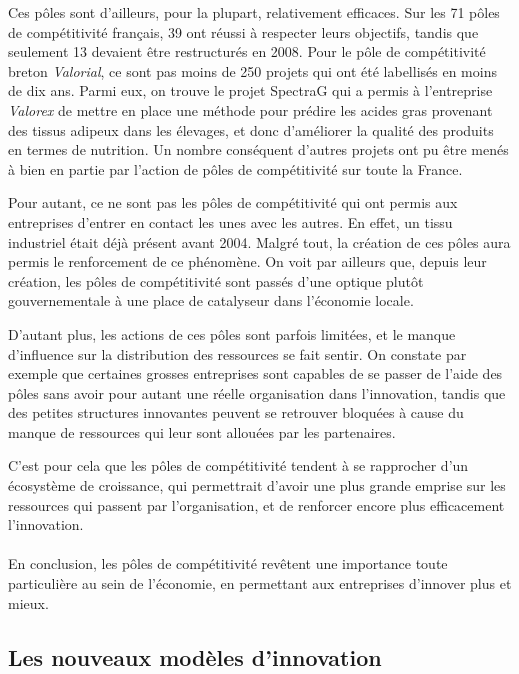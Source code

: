 \documentclass[a4paper,12pt]{report}
\begin{document}
		Ces pôles sont d’ailleurs, pour la plupart, relativement efficaces. Sur les 71 pôles de compétitivité français, 39 ont réussi à respecter leurs objectifs, tandis que seulement 13 devaient être restructurés en 2008\cite{PolesCompetitiviteClusters}. Pour le pôle de compétitivité breton \textit{Valorial}, ce sont pas moins de 250 projets qui ont été labellisés en moins de dix ans\cite{ProjetsValorial}. Parmi eux, on trouve le projet SpectraG qui a permis à l’entreprise \textit{Valorex} de mettre en place une méthode pour prédire les acides gras provenant des tissus adipeux dans les élevages, et donc d’améliorer la qualité des produits en termes de nutrition\cite{ProjetsAboutis}. Un nombre conséquent d’autres projets ont pu être menés à bien en partie par l’action de pôles de compétitivité sur toute la France.

		Pour autant, ce ne sont pas les pôles de compétitivité qui ont permis aux entreprises d’entrer en contact les unes avec les autres. En effet, un tissu industriel était déjà présent avant 2004. Malgré tout, la création de ces pôles aura permis le renforcement de ce phénomène. On voit par ailleurs que, depuis leur création, les pôles de compétitivité sont passés d’une optique plutôt gouvernementale à une place de catalyseur dans l’économie locale.

		D’autant plus, les actions de ces pôles sont parfois limitées, et le manque d’influence sur la distribution des ressources se fait sentir. On constate par exemple que certaines grosses entreprises sont capables de se passer de l’aide des pôles sans avoir pour autant une réelle organisation dans l’innovation, tandis que des petites structures innovantes peuvent se retrouver bloquées à cause du manque de ressources qui leur sont allouées par les partenaires.

		C’est pour cela que les pôles de compétitivité tendent à se rapprocher d’un écosystème de croissance, qui permettrait d’avoir une plus grande emprise sur les ressources qui passent par l’organisation, et de renforcer encore plus efficacement l’innovation.
		
		\paragraph{}En conclusion, les pôles de compétitivité revêtent une importance toute particulière au sein de l’économie, en permettant aux entreprises d’innover plus et mieux.
				
		\subsection{Les nouveaux modèles d’innovation}
\end{document}

